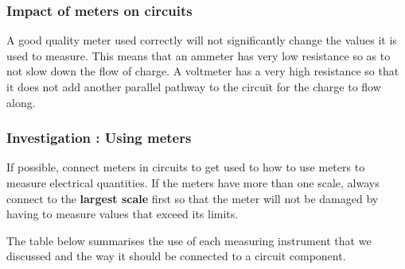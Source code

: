       

 

      \label{m38773*uid78}
            \subsubsection{ Impact of meters on circuits}
            \nopagebreak
            
        
        \label{m38773*id67854}A good quality meter used correctly will not significantly change
the values it is used to measure. This means that an ammeter has
very low resistance so as to not slow down the flow of charge. A voltmeter has a very high resistance so that it does not add another
parallel pathway to the circuit for the charge to flow along.\par 
\label{m38773*secfhsst!!!underscore!!!id1891}
            \subsubsection{  Investigation : Using meters }
            \nopagebreak
            
        \label{m38773*id67868}If possible,
connect meters in circuits to get used to how to use meters to
measure electrical quantities. If the meters have more than one
scale, always connect to the \textbf{largest scale} first so that the meter
will not be damaged by having to measure values that exceed its
limits. \par 

        \label{m38773*id67887}The table below summarises the use of each measuring instrument
that we discussed and the way it should be connected to a circuit
component.\par 
        
    
      
